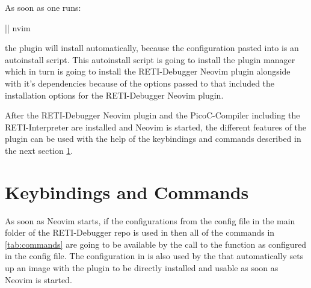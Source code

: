 \documentclass{report}
\begin{document}
As soon as one runs:

\begin{terminal}
  |\prompt| nvim
\end{terminal}

the plugin will install automatically, because the configuration pasted into  is an autoinstall script. This autoinstall script is going to install the  \alert{plugin manager} which in turn is going to install the RETI-Debugger Neovim plugin alongside with it's dependencies because of the options passed to  that included the installation options for the RETI-Debugger Neovim plugin.

After the RETI-Debugger Neovim plugin and the PicoC-Compiler including the RETI-Interpreter are installed and Neovim is started, the different features of the plugin can be used with the help of the keybindings and commands described in the next section \ref{sec:keybindings and commands}.

\section{Keybindings and Commands}
\label{sec:keybindings and commands}

As soon as Neovim starts, if the configurations from the config file  in the main folder of the RETI-Debugger repo is used in  then all of the commands in \ref{tab:commands} are going to be available by the call to the  function as configured in the config file. The configuration in  is also used by the  that automatically sets up an image with the plugin to be directly installed and usable as soon as Neovim is started.


\newcommand{\loadretiexample}{Open a menu with a listing of example PicoC programs and open one with \inlinebox{Enter}}
\newcommand{\compilepicocbuffer}{Compile PicoC code in buffer to RETI}
\newcommand{\startretibuffer}{Start RETI code in the current buffer in the RETI-Debugger. Mounts the window layout, starts the RETI-Interpreter asynchronously and sets buffer and not yet set global keybindings keybindings}
\end{document}
